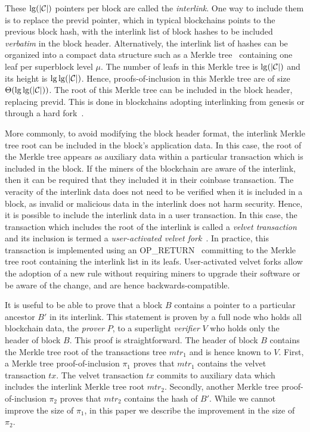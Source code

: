 These $\lg(|\mathcal{C}|)$ pointers per block are called the \emph{interlink}.
One way to include them is to replace the \textsf{previd} pointer, which in
typical blockchains points to the previous block hash, with the interlink list
of block hashes to be included \emph{verbatim} in the block header.
Alternatively, the interlink list of hashes can be
organized into a compact data structure such as a Merkle tree~\cite{merkletree}
containing one leaf per superblock level $\mu$. The number
of leafs in this Merkle tree is $\lg(|\mathcal{C}|)$ and its height is
$\lg\lg(|\mathcal{C}|)$. Hence,
proofs-of-inclusion in this Merkle tree are of size
$\Theta(\lg\lg(|\mathcal{C}|))$. The root of this Merkle tree can be included in the
block header, replacing \textsf{previd}. This is done in blockchains adopting
interlinking from genesis or through a hard fork~\cite{nimiq,ergo}.

More commonly, to avoid modifying the block header format, the interlink Merkle
tree root can be included in the block's application data. In this case, the
root of the Merkle tree appears as auxiliary data within a particular transaction
which is included in the block. If the miners of the blockchain are aware of the
interlink, then it can be required that they included it in their coinbase
transaction. The veracity of the interlink data does not need to be verified
when it is included in a block, as invalid or malicious data in the interlink
does not harm security. Hence, it is possible to include the interlink data in a user
transaction. In this case, the transaction which includes the root of the
interlink is called a \emph{velvet transaction} and its inclusion is termed a
\emph{user-activated velvet fork}~\cite{gtklocker}. In practice, this
transaction is implemented using an
\textsf{OP\_RETURN}~\cite{bartoletti2017analysis} committing to the Merkle tree
root containing the interlink list in its leafs. User-activated velvet forks
allow the adoption of a new rule without requiring miners to upgrade their
software or be aware of the change, and are hence backwards-compatible.

It is useful to be able to prove that a block $B$ contains a pointer to a
particular ancestor $B'$ in its interlink. This statement is proven by a full
node who holds all blockchain data, the \emph{prover} $P$, to a superlight
\emph{verifier} $V$ who holds only the header of block $B$. This proof is
straightforward. The header of block $B$ contains the Merkle tree root of the
transactions tree $mtr_1$ and is hence known to $V$. First, a Merkle
tree proof-of-inclusion $\pi_1$ proves that $mtr_1$ contains the velvet transaction
$tx$. The velvet transaction $tx$ commits to auxiliary data which includes the
interlink Merkle tree root $mtr_2$.
Secondly, another Merkle tree proof-of-inclusion $\pi_2$ proves that $mtr_2$
contains the hash of $B'$. While we cannot improve the size of $\pi_1$, in this
paper we describe the improvement in the size of $\pi_2$.


